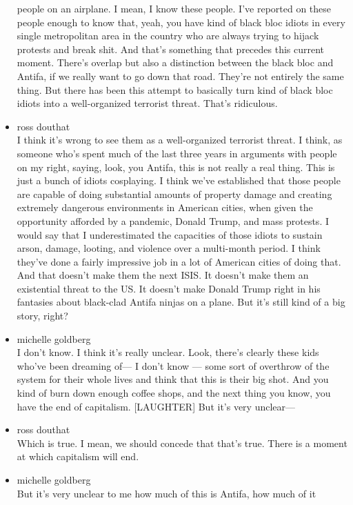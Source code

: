 \begin{itemize}
  people on an airplane. I mean, I know these people. I've reported on
  these people enough to know that, yeah, you have kind of black bloc
  idiots in every single metropolitan area in the country who are always
  trying to hijack protests and break shit. And that's something that
  precedes this current moment. There's overlap but also a distinction
  between the black bloc and Antifa, if we really want to go down that
  road. They're not entirely the same thing. But there has been this
  attempt to basically turn kind of black bloc idiots into a
  well-organized terrorist threat. That's ridiculous.
\item
  ross douthat\\
  I think it's wrong to see them as a well-organized terrorist threat. I
  think, as someone who's spent much of the last three years in
  arguments with people on my right, saying, look, you Antifa, this is
  not really a real thing. This is just a bunch of idiots cosplaying. I
  think we've established that those people are capable of doing
  substantial amounts of property damage and creating extremely
  dangerous environments in American cities, when given the opportunity
  afforded by a pandemic, Donald Trump, and mass protests. I would say
  that I underestimated the capacities of those idiots to sustain arson,
  damage, looting, and violence over a multi-month period. I think
  they've done a fairly impressive job in a lot of American cities of
  doing that. And that doesn't make them the next ISIS. It doesn't make
  them an existential threat to the US. It doesn't make Donald Trump
  right in his fantasies about black-clad Antifa ninjas on a plane. But
  it's still kind of a big story, right?
\item
  michelle goldberg\\
  I don't know. I think it's really unclear. Look, there's clearly these
  kids who've been dreaming of--- I don't know --- some sort of
  overthrow of the system for their whole lives and think that this is
  their big shot. And you kind of burn down enough coffee shops, and the
  next thing you know, you have the end of capitalism. {[}LAUGHTER{]}
  But it's very unclear---
\item
  ross douthat\\
  Which is true. I mean, we should concede that that's true. There is a
  moment at which capitalism will end.
\item
  michelle goldberg\\
  But it's very unclear to me how much of this is Antifa, how much of it

\end{itemize}
